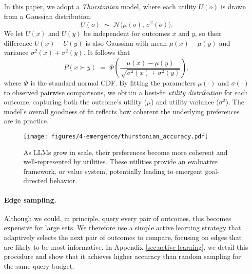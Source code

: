 In this paper, we adopt a \emph{Thurstonian} model, where each utility \(U(o)\) is drawn from a Gaussian distribution:
\[
U(o) \;\sim\; \mathcal{N}\bigl(\mu(o),\,\sigma^2(o)\bigr).
\]
We let \(U(x)\) and \(U(y)\) be independent for outcomes \(x\) and \(y\), so their difference \(U(x) - U(y)\) is also Gaussian with mean \(\mu(x) - \mu(y)\) and variance \(\sigma^2(x) + \sigma^2(y)\). It follows that
\[
P(x \succ y)
\;=\;
\Phi\!\left(\frac{\mu(x) - \mu(y)}{\sqrt{\sigma^2(x) + \sigma^2(y)}}\right),
\]
where \(\Phi\) is the standard normal CDF. By fitting the parameters \(\mu(\cdot)\) and \(\sigma(\cdot)\) to observed pairwise comparisons, we obtain a best-fit \emph{utility distribution} for each outcome, capturing both the outcome's utility (\(\mu\)) and utility variance (\(\sigma^2\)). The model’s overall goodness of fit reflects how coherent the underlying preferences are in practice.

\begin{wrapfigure}{r}{0.5\textwidth}
    \centering
    \vspace{-20pt}
    \texttt{[image: figures/4-emergence/thurstonian\_accuracy.pdf]}
    \vspace{-20pt}
    \caption{As LLMs grow in scale, their preferences become more coherent and well-represented by utilities. These utilities provide an evaluative framework, or value system, potentially leading to emergent goal-directed behavior.}
    \label{fig:thurstonian_accuracy}
    \vspace{-20pt}
\end{wrapfigure}

\paragraph{Edge sampling.}
Although we could, in principle, query every pair of outcomes, this becomes expensive for large sets. We therefore use a simple active learning strategy that adaptively selects the next pair of outcomes to compare, focusing on edges that are likely to be most informative. In Appendix \ref{sec:active-learning}, we detail this procedure and show that it achieves higher accuracy than random sampling for the same query budget.

